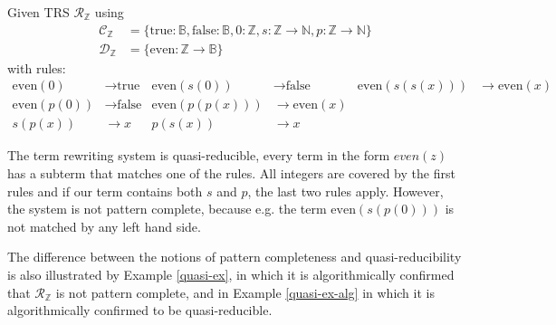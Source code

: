 \begin{example} \label{quasi-ex-complete}
Given TRS $\mathcal{R}_{\mathbb{Z}}$ using
\begin{align*}
    \mathcal{C}_{\mathbb{Z}} &= \{\text{true}: \mathbb{B}, \text{false}: \mathbb{B}, 0: \mathbb{Z}, s: \mathbb{Z} \rightarrow \mathbb{N}, p: \mathbb{Z} \rightarrow \mathbb{N}\} \\
    \mathcal{D}_{\mathbb{Z}} &= \{\text{even}: \mathbb{Z} \rightarrow \mathbb{B}\}
\end{align*}
with rules:
\begin{align*}
    \text{even}(0) &\rightarrow \text{true} & \text{even}(s(0)) &\rightarrow \text{false} & \text{even}(s(s(x))) &\rightarrow \text{even}(x) \\
    \text{even}(p(0)) &\rightarrow \text{false} &
    \text{even}(p(p(x))) &\rightarrow \text{even}(x) \\ 
    s(p(x)) &\rightarrow x & p(s(x)) &\rightarrow x
\end{align*}
\end{example}
The term rewriting system is quasi-reducible, every term in the form $even(z)$ has a subterm that matches one of the rules. All integers are covered by the first rules and if our term contains both $s$ and $p$, the last two rules apply. However, the system is not pattern complete, because e.g. the term $\text{even}(s(p(0)))$ is not matched by any left hand side.

The difference between the notions of pattern completeness and quasi-reducibility is also illustrated by Example \ref{quasi-ex}, in which it is algorithmically confirmed that $\mathcal{R}_{\mathbb{Z}}$ is not pattern complete, and in Example \ref{quasi-ex-alg} in which it is algorithmically confirmed to be quasi-reducible.

